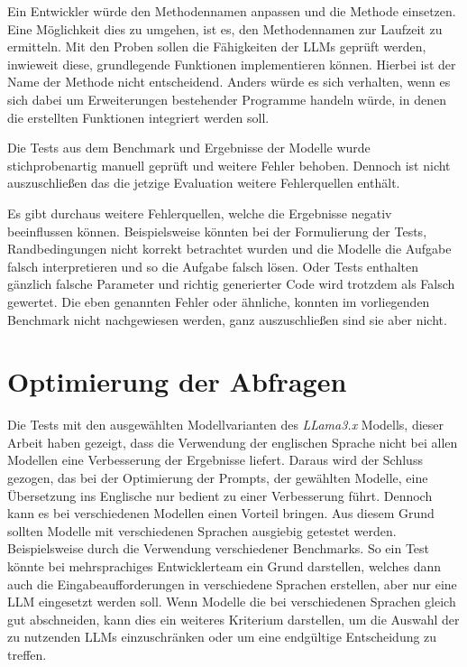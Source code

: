 Ein Entwickler würde den Methodennamen anpassen und die Methode einsetzen. Eine Möglichkeit dies zu umgehen, ist es, den Methodennamen zur Laufzeit zu ermitteln. Mit den Proben sollen die Fähigkeiten der LLMs geprüft werden, inwieweit diese, grundlegende Funktionen implementieren können. Hierbei ist der Name der Methode nicht entscheidend. Anders würde es sich verhalten, wenn es sich dabei um Erweiterungen bestehender Programme handeln würde, in denen die erstellten Funktionen integriert werden soll.\vspace{0.2cm}

Die Tests aus dem Benchmark und Ergebnisse der Modelle wurde stichprobenartig manuell geprüft und weitere Fehler behoben. Dennoch ist nicht auszuschließen das die jetzige Evaluation weitere Fehlerquellen enthält.\vspace{0.2cm}

Es gibt durchaus weitere Fehlerquellen, welche die Ergebnisse negativ beeinflussen können. Beispielsweise könnten bei der Formulierung der Tests, Randbedingungen nicht korrekt betrachtet wurden und die Modelle die Aufgabe falsch interpretieren und so die Aufgabe falsch lösen. Oder Tests enthalten gänzlich falsche Parameter und richtig generierter Code wird trotzdem als Falsch gewertet. Die eben genannten Fehler oder ähnliche, konnten im vorliegenden Benchmark nicht nachgewiesen werden, ganz auszuschließen sind sie aber nicht.\vspace{0.2cm}



\section{Optimierung der Abfragen}
Die Tests mit den ausgewählten Modellvarianten des \textit{LLama3.x} Modells, dieser Arbeit haben gezeigt, dass die Verwendung der englischen Sprache nicht bei allen Modellen eine Verbesserung der Ergebnisse liefert. Daraus wird der Schluss gezogen, das bei der Optimierung der Prompts, der gewählten Modelle, eine Übersetzung ins Englische nur bedient zu einer Verbesserung führt. Dennoch kann es bei verschiedenen Modellen einen Vorteil bringen. Aus diesem Grund sollten Modelle mit verschiedenen Sprachen ausgiebig getestet werden. Beispielsweise durch die Verwendung verschiedener Benchmarks. So ein Test könnte bei mehrsprachiges Entwicklerteam ein Grund darstellen, welches dann auch die Eingabeaufforderungen in verschiedene Sprachen erstellen, aber nur eine LLM eingesetzt werden soll. Wenn Modelle die bei verschiedenen Sprachen gleich gut abschneiden, kann dies ein weiteres Kriterium darstellen, um die Auswahl der zu nutzenden LLMs einzuschränken oder um eine endgültige Entscheidung zu treffen.\vspace{0.2cm}

